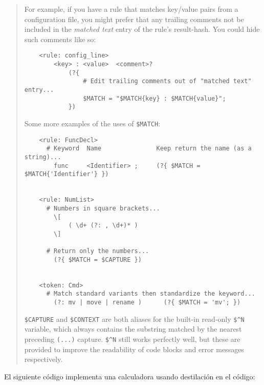 \begin{it}
\begin{quotation}
For example, if you have a rule that matches key/value pairs from a
configuration file, you might prefer that any trailing comments not
be included in the {\it matched text} entry of the rule's result-hash. You
could hide such comments like so:

\begin{verbatim}
    <rule: config_line>
        <key> : <value>  <comment>?
            (?{
                # Edit trailing comments out of "matched text" entry...
                $MATCH = "$MATCH{key} : $MATCH{value}";
            })
\end{verbatim}

Some more examples of the uses of \verb|$MATCH|:

\begin{verbatim}
    <rule: FuncDecl>
      # Keyword  Name               Keep return the name (as a string)...
        func     <Identifier> ;     (?{ $MATCH = $MATCH{'Identifier'} })


    <rule: NumList>
      # Numbers in square brackets...
        \[ 
            ( \d+ (?: , \d+)* )
        \]

      # Return only the numbers...
        (?{ $MATCH = $CAPTURE })


    <token: Cmd>
      # Match standard variants then standardize the keyword...
        (?: mv | move | rename )      (?{ $MATCH = 'mv'; })
\end{verbatim}

\verb|$CAPTURE| and \verb|$CONTEXT|
    are both aliases for the built-in read-only \verb|$^N |variable, 
which always contains the substring matched by 
the nearest preceding \verb|(...)| capture. 
\verb|$^N| still works perfectly well, but these are provided 
to improve the readability of code blocks and error messages respectively.
\end{quotation}\end{it}

El siguiente código implementa una calculadora
usando destilación en  el código:

